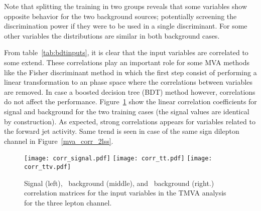 

Note that splitting the training in two groups reveals that some variables show opposite behavior for the two background sources; potentially screening the discrimination power if they were to be used in a single discriminant. For some other variables the distributions are similar in both background cases.

From table~\ref{tab:bdtinputs}, it is clear that the input variables are correlated to some extend. These correlations play an important role for some MVA methods like the Fisher discriminant method in which the first step consist of performing a linear transformation to an phase space where the correlations between variables are removed. In case a boosted decision tree (BDT) method however, correlations do not affect the performance. Figure~\ref{mva_corr} show the linear correlation coefficients for signal and background for the two training cases (the signal values are identical by construction). As expected, strong correlations appears for variables related to the forward jet activity. Same trend is seen in case of the same sign dilepton channel in Figure~\ref{mva_corr_2lss}.

\begin{figure} [!h]
  \centering
   \texttt{[image: corr\_signal.pdf]}
   \texttt{[image: corr\_tt.pdf]}
   \texttt{[image: corr\_ttv.pdf]}

\caption[Correlation matrices for the BDT input variables.]{ Signal (left), \ttbar\ background (middle), and \ttV\ background (right.) correlation matrices for the input variables in the TMVA analysis for the three lepton channel.}
\label{mva_corr}
\end{figure}

